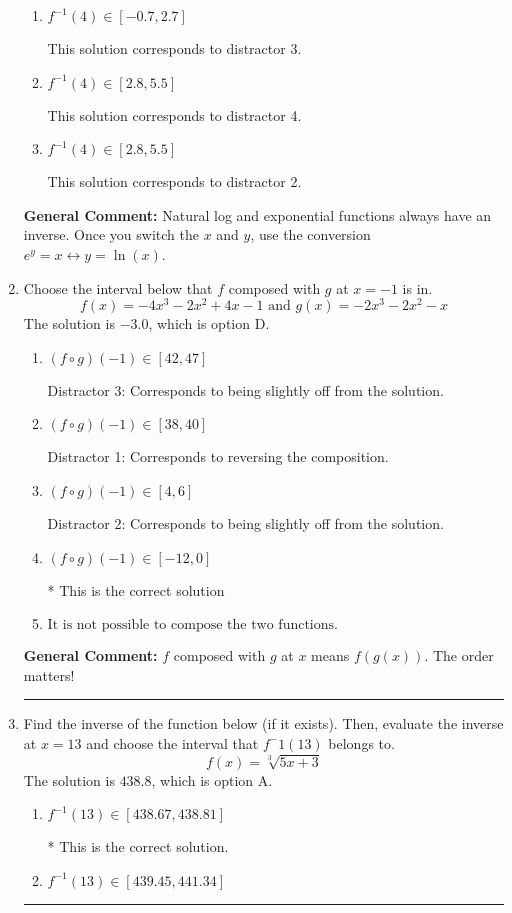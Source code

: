 \documentclass{extbook}[14pt]
\newcommand{\litem}[1]{\item #1

\rule{\textwidth}{0.4pt}}
\begin{document}
\begin{enumerate}
{\begin{enumerate}[label=\Alph*.]
 This is the solution.
\item \( f^{-1}(4) \in [-0.7, 2.7] \)

 This solution corresponds to distractor 3.
\item \( f^{-1}(4) \in [2.8, 5.5] \)

 This solution corresponds to distractor 4.
\item \( f^{-1}(4) \in [2.8, 5.5] \)

 This solution corresponds to distractor 2.
\end{enumerate}

\textbf{General Comment:} Natural log and exponential functions always have an inverse. Once you switch the $x$ and $y$, use the conversion $ e^y = x \leftrightarrow y=\ln(x)$.
}
\litem{
Choose the interval below that $f$ composed with $g$ at $x=-1$ is in.
\[ f(x) = -4x^{3} -2 x^{2} +4 x -1 \text{ and } g(x) = -2x^{3} -2 x^{2} -x \]The solution is \( -3.0 \), which is option D.\begin{enumerate}[label=\Alph*.]
\item \( (f \circ g)(-1) \in [42, 47] \)

 Distractor 3: Corresponds to being slightly off from the solution.
\item \( (f \circ g)(-1) \in [38, 40] \)

 Distractor 1: Corresponds to reversing the composition.
\item \( (f \circ g)(-1) \in [4, 6] \)

 Distractor 2: Corresponds to being slightly off from the solution.
\item \( (f \circ g)(-1) \in [-12, 0] \)

* This is the correct solution
\item \( \text{It is not possible to compose the two functions.} \)


\end{enumerate}

\textbf{General Comment:} $f$ composed with $g$ at $x$ means $f(g(x))$. The order matters!
}
\litem{
Find the inverse of the function below (if it exists). Then, evaluate the inverse at $x = 13$ and choose the interval that $f^-1(13)$ belongs to.
\[ f(x) = \sqrt[3]{5 x + 3} \]The solution is \( 438.8 \), which is option A.\begin{enumerate}[label=\Alph*.]
\item \( f^{-1}(13) \in [438.67, 438.81] \)

* This is the correct solution.
\item \( f^{-1}(13) \in [439.45, 441.34] \)


\end{enumerate}}
\end{enumerate}
\end{document}
